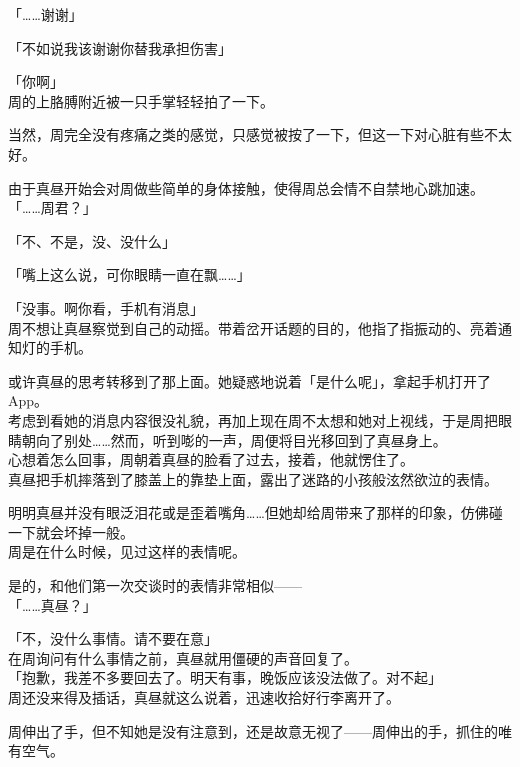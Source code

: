 「……谢谢」

「不如说我该谢谢你替我承担伤害」

「你啊」\\

周的上胳膊附近被一只手掌轻轻拍了一下。

当然，周完全没有疼痛之类的感觉，只感觉被按了一下，但这一下对心脏有些不太好。

由于真昼开始会对周做些简单的身体接触，使得周总会情不自禁地心跳加速。\\

「……周君？」

「不、不是，没、没什么」

「嘴上这么说，可你眼睛一直在飘……」

「没事。啊你看，手机有消息」\\

周不想让真昼察觉到自己的动摇。带着岔开话题的目的，他指了指振动的、亮着通知灯的手机。

或许真昼的思考转移到了那上面。她疑惑地说着「是什么呢」，拿起手机打开了App。\\

考虑到看她的消息内容很没礼貌，再加上现在周不太想和她对上视线，于是周把眼睛朝向了别处……然而，听到嘭的一声，周便将目光移回到了真昼身上。\\

心想着怎么回事，周朝着真昼的脸看了过去，接着，他就愣住了。\\

真昼把手机摔落到了膝盖上的靠垫上面，露出了迷路的小孩般泫然欲泣的表情。

明明真昼并没有眼泛泪花或是歪着嘴角……但她却给周带来了那样的印象，仿佛碰一下就会坏掉一般。\\

周是在什么时候，见过这样的表情呢。

是的，和他们第一次交谈时的表情非常相似——\\

「……真昼？」

「不，没什么事情。请不要在意」\\

在周询问有什么事情之前，真昼就用僵硬的声音回复了。\\

「抱歉，我差不多要回去了。明天有事，晚饭应该没法做了。对不起」\\

周还没来得及插话，真昼就这么说着，迅速收拾好行李离开了。

周伸出了手，但不知她是没有注意到，还是故意无视了——周伸出的手，抓住的唯有空气。\\

